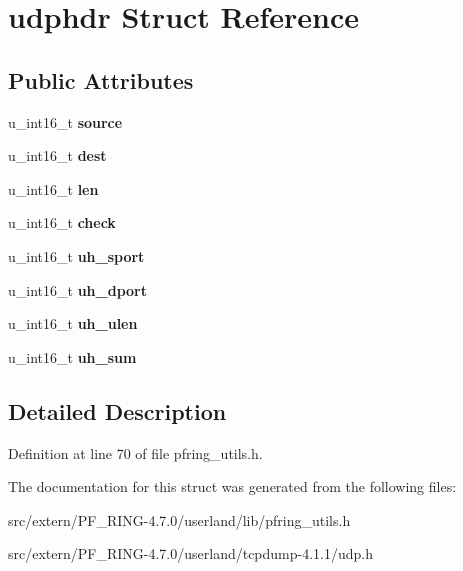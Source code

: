 \hypertarget{structudphdr}{
\section{udphdr Struct Reference}
\label{structudphdr}
}
\subsection*{Public Attributes}
\begin{DoxyCompactItemize}
\item 
\hypertarget{structudphdr_a6351a5405393a999631ded88ba819936}{
u\_\-int16\_\-t {\bfseries source}}
\label{structudphdr_a6351a5405393a999631ded88ba819936}

\item 
\hypertarget{structudphdr_a27fffdeafd1dd8c6f70167f176b2809d}{
u\_\-int16\_\-t {\bfseries dest}}
\label{structudphdr_a27fffdeafd1dd8c6f70167f176b2809d}

\item 
\hypertarget{structudphdr_aef348eb633ea3c883566dba16a5eb060}{
u\_\-int16\_\-t {\bfseries len}}
\label{structudphdr_aef348eb633ea3c883566dba16a5eb060}

\item 
\hypertarget{structudphdr_a1bca4ebc14856eac4653016dc4b14cb7}{
u\_\-int16\_\-t {\bfseries check}}
\label{structudphdr_a1bca4ebc14856eac4653016dc4b14cb7}

\item 
\hypertarget{structudphdr_ab4c0a0878f22ab57e5e203b7f4496f01}{
u\_\-int16\_\-t {\bfseries uh\_\-sport}}
\label{structudphdr_ab4c0a0878f22ab57e5e203b7f4496f01}

\item 
\hypertarget{structudphdr_a717e032d2b34025297d3078f05407efd}{
u\_\-int16\_\-t {\bfseries uh\_\-dport}}
\label{structudphdr_a717e032d2b34025297d3078f05407efd}

\item 
\hypertarget{structudphdr_accabf57f60185986f873fd309e4a4f16}{
u\_\-int16\_\-t {\bfseries uh\_\-ulen}}
\label{structudphdr_accabf57f60185986f873fd309e4a4f16}

\item 
\hypertarget{structudphdr_af567db164c1a67466da85d4b95fd75a1}{
u\_\-int16\_\-t {\bfseries uh\_\-sum}}
\label{structudphdr_af567db164c1a67466da85d4b95fd75a1}

\end{DoxyCompactItemize}


\subsection{Detailed Description}


Definition at line 70 of file pfring\_\-utils.h.



The documentation for this struct was generated from the following files:\begin{DoxyCompactItemize}
\item 
src/extern/PF\_\-RING-\/4.7.0/userland/lib/pfring\_\-utils.h\item 
src/extern/PF\_\-RING-\/4.7.0/userland/tcpdump-\/4.1.1/udp.h\end{DoxyCompactItemize}
